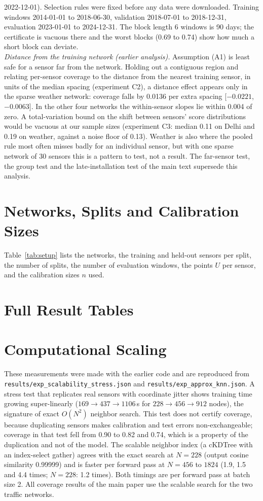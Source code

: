 \documentclass[journal,onecolumn]{IEEEtran}
\begin{document}
2022-12-01). Selection rules were fixed before any data were downloaded. Training windows 2014-01-01 to 2018-06-30, validation 2018-07-01 to 2018-12-31,
evaluation 2023-01-01 to 2024-12-31. The block length 6 windows is 90 days; the certificate is vacuous
there and the worst blocks (0.69 to 0.74) show how much a short block can deviate.\\
\emph{Distance from the training network (earlier analysis).} Assumption (A1) is least safe for a sensor far from
the network. Holding out a contiguous region and relating per-sensor coverage to the distance from the nearest
training sensor, in units of the median spacing (experiment C2), a distance effect appears only in the sparse weather
network: coverage falls by 0.0136 per extra spacing [$-0.0221$, $-0.0063$]. In the other four networks the
within-sensor slopes lie within 0.004 of zero. A total-variation bound on the shift between sensors' score
distributions would be vacuous at our sample sizes (experiment C3: median 0.11 on Delhi and 0.19 on weather, against a
noise floor of 0.13). Weather is also where the pooled rule most often misses badly for an individual sensor, but with
one sparse network of 30 sensors this is a pattern to test, not a result. The far-sensor test, the group test and the
late-installation test of the main text supersede this analysis.
\section{Networks, Splits and Calibration Sizes}
Table~\ref{tab:setup} lists the networks, the training and held-out sensors per split, the number of splits, the
number of evaluation windows, the points $U$ per sensor, and the calibration sizes $n$ used.


\section{Full Result Tables}


\section{Computational Scaling}
These measurements were made with the earlier code and are reproduced from
\texttt{results/exp\_scalability\_stress.json} and \texttt{results/exp\_approx\_knn.json}. A stress test
that replicates real sensors with coordinate jitter shows training time growing super-linearly
($169\to437\to1106$\,s for $228\to456\to912$ nodes), the signature of exact $O(N^2)$ neighbor search.
This test does not certify coverage, because duplicating sensors makes calibration and test errors
non-exchangeable; coverage in that test fell from 0.90 to 0.82 and 0.74, which is a property of the
duplication and not of the model. The scalable neighbor index (a cKDTree with an index-select gather)
agrees with the exact search at $N{=}228$ (output cosine similarity 0.99999) and is faster per forward
pass at $N{=}456$ to $1824$ (1.9, 1.5 and 4.4 times; $N{=}228$: 1.2 times). Both timings are per
forward pass at batch size 2. All coverage results of the main paper use the scalable search for the two
traffic networks.
\end{document}
